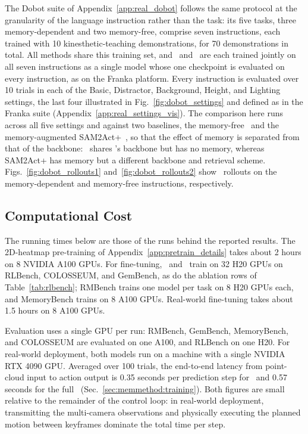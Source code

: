 The Dobot suite of Appendix~\ref{app:real_dobot} follows the same
protocol at the granularity of the language instruction rather than the
task: its five tasks, three memory-dependent and two memory-free,
comprise seven instructions, each trained with 10 kinesthetic-teaching
demonstrations, for 70 demonstrations in total.
All methods share this training set, and \method\ and \memmethod\ are
each trained jointly on all seven instructions as a single model whose
one checkpoint is evaluated on every instruction, as on the Franka
platform.
Every instruction is evaluated
over 10 trials in each of the Basic, Distractor, Background, Height,
and Lighting settings, the last four illustrated in
Fig.~\ref{fig:dobot_settings} and defined as in the Franka suite
(Appendix~\ref{app:real_settings_vis}).
The comparison here runs across all five
settings and against two baselines, the memory-free \method\ and the
memory-augmented SAM2Act+~\cite{fang2025sam2act}, so that the effect of
memory is separated from that of the backbone: \method\ shares
\memmethod's backbone but has no memory, whereas SAM2Act+ has memory
but a different backbone and retrieval scheme.
Figs.~\ref{fig:dobot_rollouts1} and~\ref{fig:dobot_rollouts2} show
\memmethod\ rollouts on the memory-dependent and memory-free
instructions, respectively.

\subsection{Computational Cost}
\label{app:compute_resources}

The running times below are those of the runs behind the reported
results.
The 2D-heatmap pre-training of Appendix~\ref{app:pretrain_details}
takes about 2 hours on 8 NVIDIA A100 GPUs.
For fine-tuning, \method\ and \memmethod\ train on 32 H20 GPUs on
RLBench, COLOSSEUM, and GemBench, as do the ablation rows of
Table~\ref{tab:rlbench}; RMBench trains one model per task on 8 H20
GPUs each, and MemoryBench trains on 8 A100 GPUs.
Real-world fine-tuning takes about 1.5 hours on 8 A100 GPUs.

Evaluation uses a single GPU per run: RMBench, GemBench, MemoryBench,
and COLOSSEUM are evaluated on one A100, and RLBench on one H20.
For real-world deployment, both models run on a machine with a single
NVIDIA RTX 4090 GPU.
Averaged over 100 trials, the end-to-end latency from point-cloud input
to action output is 0.35 seconds per prediction step for \method\ and
0.57 seconds for the full \memmethod\
(Sec.~\ref{sec:memmethod:training}).
Both figures are small relative to the remainder of the control loop:
in real-world deployment, transmitting the multi-camera observations
and physically executing the planned motion between keyframes dominate
the total time per step.

